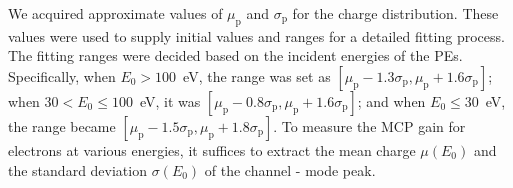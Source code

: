 We acquired approximate values of $\mu_{\mathrm{p}}$ and $\sigma_{\mathrm{p}}$ for the charge distribution. These values were used to supply initial values and ranges for a detailed fitting process. The fitting ranges were decided based on the incident energies of the PEs. Specifically, when $E_0>100$~\si{eV}, the range was set as $[\mu_{\mathrm{p}} - 1.3\sigma_{\mathrm{p}}, \mu_{\mathrm{p}}+1.6\sigma_{\mathrm{p}}]$; when $30<E_0\leqslant 100$~\si{eV}, it was $[\mu_{\mathrm{p}} - 0.8\sigma_{\mathrm{p}}, \mu_{\mathrm{p}}+1.6\sigma_{\mathrm{p}}]$; and when $E_0\leqslant 30$~\si{eV}, the range became $[\mu_{\mathrm{p}} - 1.5\sigma_{\mathrm{p}}, \mu_{\mathrm{p}}+1.8\sigma_{\mathrm{p}}]$. To measure the MCP gain for electrons at various energies, it suffices to extract the mean charge $\mu(E_0)$ and the standard deviation $\sigma(E_0)$ of the channel - mode peak.

